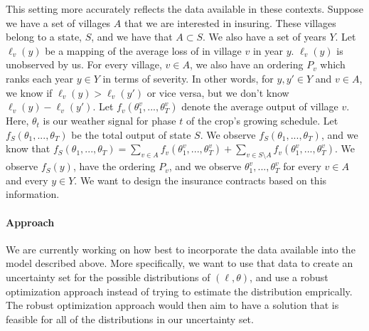 \documentclass[11pt]{article}
\begin{document}
    This setting more accurately reflects the data available in these contexts. Suppose we have a set of villages $A$ that we are interested in insuring. These villages belong to a state, $S$, and we have that $A \subset S$. We also have a set of years $Y$. Let $\ell_v(y)$ be a mapping of the average loss of in village $v$ in year $y$. $\ell_v(y)$ is unobserved by us. For every village, $v \in A$, we also have an ordering $P_v$ which ranks each year $y \in Y$ in terms of severity. In other words, for $y, y' \in Y$ and $v \in A$, we know if $\ell_v(y) > \ell_v(y')$ or vice versa, but we don't know $\ell_v(y) - \ell_v(y')$. Let $f_v(\theta^v_1,...,\theta^v_T)$ denote the average output of village $v$. Here, $\theta_t$ is our weather signal for phase $t$ of the crop's growing schedule. Let $f_S(\theta_1,...,\theta_T)$ be the total output of state $S$. We observe $f_S(\theta_1,...,\theta_T)$, and we know that $f_S(\theta_1,...,\theta_T) = \sum_{v\in A} f_v(\theta^v_1,...,\theta^v_T) + \sum_{v \in S \setminus A} f_v(\theta^v_1,...,\theta^v_T)$. We observe $f_S(y)$, have the ordering $P_v$, and we observe $\theta^v_1,...,\theta^v_T$ for every $v \in A$ and every $y \in Y$. We want to design the insurance contracts based on this information. 

    \paragraph*{Approach} We are currently working on how best to incorporate the data available into the model described above. More specifically, we want to use that data to create an uncertainty set for the possible distributions of $(\ell,\theta)$, and use a robust optimization approach instead of trying to estimate the distribution emprically. The robust optimization approach would then aim to have a solution that is feasible for all of the distributions in our uncertainty set. 
    

\printbibliography
\end{document}
